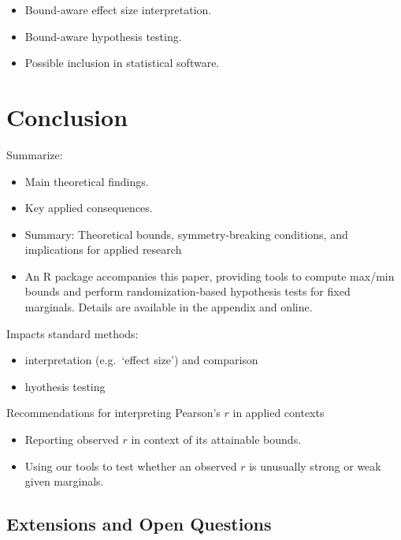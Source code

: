 \documentclass[
  12pt,
]{article}
\providecommand{\tightlist}{%
  \setlength{\itemsep}{0pt}\setlength{\parskip}{0pt}}
\theoremstyle{plain}
\theoremstyle{definition}
\theoremstyle{remark}
\begin{document}
\begin{itemize}
\tightlist
\item
  Bound-aware effect size interpretation.
\item
  Bound-aware hypothesis testing.
\item
  Possible inclusion in statistical software.
\end{itemize}

\section{Conclusion}\label{conclusion}

Summarize:

\begin{itemize}
\item
  Main theoretical findings.
\item
  Key applied consequences.
\item
  Summary: Theoretical bounds, symmetry-breaking conditions, and
  implications for applied research
\item
  An R package accompanies this paper, providing tools to compute
  max/min bounds and perform randomization-based hypothesis tests for
  fixed marginals. Details are available in the appendix and online.
\end{itemize}

Impacts standard methods:

\begin{itemize}
\tightlist
\item
  interpretation (e.g.~`effect size') and comparison
\item
  hyothesis testing
\end{itemize}

Recommendations for interpreting Pearson's \(r\) in applied contexts

\begin{itemize}
\tightlist
\item
  Reporting observed \(r\) in context of its attainable bounds.
\item
  Using our tools to test whether an observed \(r\) is unusually strong
  or weak given marginals.
\end{itemize}

\subsection{Extensions and Open
Questions}\label{extensions-and-open-questions}
\end{document}

